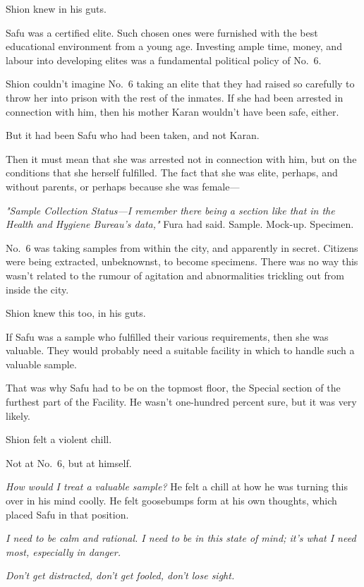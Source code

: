 Shion knew in his guts.

Safu was a certified elite. Such chosen ones were furnished with the
best educational environment from a young age. Investing ample time,
money, and labour into developing elites was a fundamental political
policy of No.~6.

Shion couldn't imagine No.~6 taking an elite that they had raised so
carefully to throw her into prison with the rest of the inmates. If she
had been arrested in connection with him, then his mother Karan wouldn't
have been safe, either.

But it had been Safu who had been taken, and not Karan.

Then it must mean that she was arrested not in connection with him, but
on the conditions that she herself fulfilled. The fact that she was
elite, perhaps, and without parents, or perhaps because she was female---

\emph{"Sample Collection Status---I remember there being a section like that in
the Health and Hygiene Bureau's data,"} Fura had said. Sample. Mock-up.
Specimen.

No.~6 was taking samples from within the city, and apparently in secret.
Citizens were being extracted, unbeknownst, to become specimens. There
was no way this wasn't related to the rumour of agitation and
abnormalities trickling out from inside the city.

Shion knew this too, in his guts.

If Safu was a sample who fulfilled their various requirements, then she
was valuable. They would probably need a suitable facility in which to
handle such a valuable sample.

That was why Safu had to be on the topmost floor, the Special section of
the furthest part of the Facility. He wasn't one-hundred percent sure,
but it was very likely.

Shion felt a violent chill.

Not at No.~6, but at himself.

\emph{How would I treat a valuable sample?} He felt a chill at how he was
turning this over in his mind coolly. He felt goosebumps form at his own
thoughts, which placed Safu in that position.

\emph{I need to be calm and rational. I need to be in this state of mind; it's
what I need most, especially in danger.}

\emph{Don't get distracted, don't get fooled, don't lose sight.}

